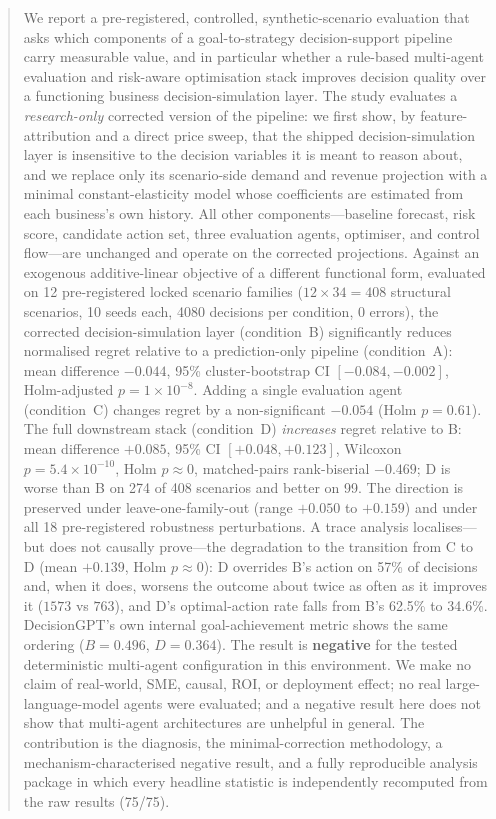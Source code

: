 \documentclass[conference]{IEEEtran}
\begin{document}
\begin{abstract}
We report a pre-registered, controlled, synthetic-scenario evaluation that asks
which components of a goal-to-strategy decision-support pipeline carry
measurable value, and in particular whether a rule-based multi-agent evaluation
and risk-aware optimisation stack improves decision quality over a functioning
business decision-simulation layer. The study evaluates a \emph{research-only}
corrected version of the pipeline: we first show, by feature-attribution and a
direct price sweep, that the shipped decision-simulation layer is insensitive to
the decision variables it is meant to reason about, and we replace only its
scenario-side demand and revenue projection with a minimal constant-elasticity
model whose coefficients are estimated from each business's own history. All
other components---baseline forecast, risk score, candidate action set, three
evaluation agents, optimiser, and control flow---are unchanged and operate on
the corrected projections. Against an exogenous additive-linear objective of a
different functional form, evaluated on 12 pre-registered locked scenario
families ($12\times34 = 408$ structural scenarios, 10 seeds each, 4080 decisions
per condition, 0 errors), the corrected decision-simulation layer (condition~B)
significantly reduces normalised regret relative to a prediction-only pipeline
(condition~A):
mean difference $-0.044$, 95\% cluster-bootstrap CI $[-0.084,-0.002]$,
Holm-adjusted $p=1\times10^{-8}$. Adding a single evaluation agent (condition~C)
changes regret by a non-significant $-0.054$ (Holm $p=0.61$). The full
downstream stack (condition~D) \emph{increases} regret relative to B: mean
difference $+0.085$, 95\% CI $[+0.048,+0.123]$, Wilcoxon $p=5.4\times10^{-10}$,
Holm $p\approx0$, matched-pairs rank-biserial $-0.469$; D is worse than B on
274 of 408 scenarios and better on 99. The direction is preserved under
leave-one-family-out (range $+0.050$ to $+0.159$) and under all 18
pre-registered robustness perturbations. A trace analysis localises---but does
not causally prove---the degradation to the transition from C to D
(mean $+0.139$, Holm $p\approx0$): D overrides B's action on 57\% of decisions
and, when it does, worsens the outcome about twice as often as it improves it
($1573$ vs $763$), and D's optimal-action rate falls from B's 62.5\% to 34.6\%.
DecisionGPT's own internal goal-achievement metric shows the same ordering
($B=0.496$, $D=0.364$). The result is \textbf{negative} for the tested
deterministic multi-agent configuration in this environment. We make no claim of
real-world, SME, causal, ROI, or deployment effect; no real large-language-model
agents were evaluated; and a negative result here does not show that multi-agent
architectures are unhelpful in general. The contribution is the diagnosis, the
minimal-correction methodology, a mechanism-characterised negative result, and a
fully reproducible analysis package in which every headline statistic is
independently recomputed from the raw results (75/75).
\end{abstract}
\end{document}
